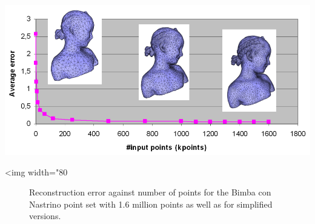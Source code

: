 \begin{center}
    \label{Surface_reconstruction_points_3-fig-simplification_bench}
    \begin{ccTexOnly}
      \includegraphics[width=1.0\textwidth]{Surface_reconstruction_points_3/simplification_bench}
    \end{ccTexOnly}
    \begin{ccHtmlOnly}
        <img width="80%
    \end{ccHtmlOnly}
    \begin{figure}[h]
        \caption{Reconstruction error against number of points
                 for the Bimba con Nastrino point set with 1.6 million points
                 as well as for simplified versions.}
    \end{figure}
\end{center}





